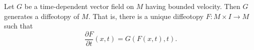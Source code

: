 Let $G$ be a time-dependent vector field on $M$ having bounded velocity. Then $G$ generates a diffeotopy of $M$. That is, there is a unique diffeotopy $F: M \times I \rightarrow M$ such that
\[
\frac{\partial F}{\partial t}(x,t) = G(F(x,t),t).
\]

